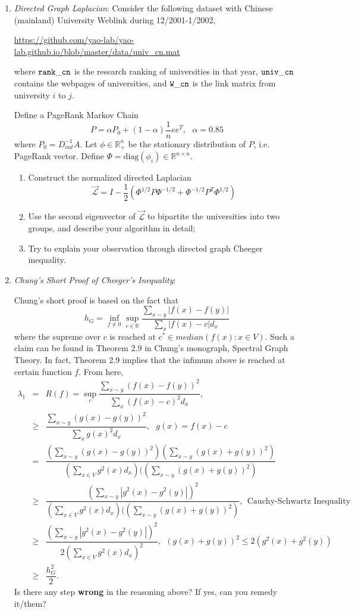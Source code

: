 \documentclass[11pt]{article}
\def\R{{\mathbb R}}
\def\diag{{\mathrm{diag}}}
\begin{document}
\begin{enumerate}
\item {\em *Directed Graph Laplacian}: Consider the following dataset with Chinese (mainland) University Weblink during 12/2001-1/2002,

\url{https://github.com/yao-lab/yao-lab.github.io/blob/master/data/univ_cn.mat}

where $\tt{rank\_{}cn}$ is the research ranking of universities in that year, $\tt{univ\_{}cn}$ contains the webpages of universities, and $\tt{W\_{}cn}$ is the link matrix from university
$i$ to $j$. 

Define a PageRank Markov Chain
\[  P = \alpha P_0 + (1-\alpha) \frac{1}{n} e e^T, \ \ \ \alpha = 0.85 \]
where $P_0 = D_{out}^{-1} A$. Let $\phi\in \R_+^n$ be the stationary distribution of $P$, i.e. PageRank vector. Define $\Phi = \diag(\phi_i)\in \R^{n\times n}$.
\begin{enumerate}
\item Construct the normalized directed Laplacian 
\[ \mathcal{\vec{L}}=I - \frac{1}{2}(\Phi^{1/2} P \Phi^{-1/2} + \Phi^{-1/2} P^T \Phi^{1/2} ) \]
\item Use the second eigenvector of $\mathcal{\vec{L}}$ to bipartite the universities into two groups, and describe your algorithm in detail;
\item Try to explain your observation through directed graph Cheeger inequality.
\end{enumerate} 
  


\item {\em *Chung's Short Proof of Cheeger's Inequality}: 

Chung's short proof is based on the fact that 
\begin{equation} 
h_G = \inf_{f\neq 0} \sup_{c\in \R} \frac{\sum_{x\sim y} |f(x) - f(y)|}{\sum_x |f(x) -c|d_x} 
\end{equation}
where the supreme over $c$ is reached at $c^*\in median(f(x):x\in V)$. Such a claim can be found in Theorem 2.9 in Chung's monograph, Spectral Graph Theory. In fact, Theorem 2.9 implies that the infimum above is reached at certain function $f$. From here, 
\begin{eqnarray}
\lambda_1 & =& R(f)=\sup_c \dfrac{\sum_{x\sim y}(f(x) - f(y))^2}{\sum_{x}(f(x)-c)^2 d_x},  \\
& \geq  &\dfrac{\sum_{x\sim y}(g(x) - g(y))^2}{\sum_{x}g(x)^2 d_x}, \ \ \ g(x)=f(x)-c\\
& = & \dfrac{(\sum_{x\sim y}(g(x) - g(y))^2)(\sum_{x\sim y}(g(x) +g(y))^2)}{(\sum_{x\in V}g^2(x)d_x)((\sum_{x\sim y}(g(x) +g(y))^2)} \\
& \ge & \dfrac{(\sum_{x\sim y}|g^2(x) - g^2(y)|)^2}{(\sum_{x\in V}g^2(x)d_x)((\sum_{x\sim y}(g(x) +g(y))^2)} , \ \ \textrm{Cauchy-Schwartz Inequality} \\
& \ge & \dfrac{(\sum_{x\sim y}|g^2(x) - g^2(y)|)^2}{2( \sum_{x\in V}g^2(x)d_x)^2} , \ \ \textrm{$(g(x)+g(y))^2\leq 2 (g^2(x)+g^2(y))$} \\
& \ge & \dfrac{h_G^2}{2}.
\end{eqnarray}
Is there any step {\bf wrong} in the reasoning above? If yes, can you remedy it/them?

\end{enumerate}
\end{document}
